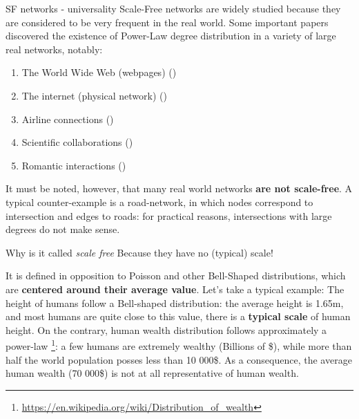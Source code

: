 \begin{textbox}{SF networks - universality}
    Scale-Free networks are widely studied because they are considered to be very frequent in the real world. Some important papers discovered the existence of Power-Law degree distribution in a variety of large real networks, notably:
    \begin{enumerate}
        \item The World Wide Web (webpages) (\cite{barabasi1999emergence})
        \item The internet (physical network) (\cite{faloutsos1999power})
        \item Airline connections (\cite{guimera2004modeling})
        \item Scientific collaborations (\cite{newman2001structure})
        \item Romantic interactions (\cite{liljeros2001web})
    \end{enumerate}

    It must be noted, however, that many real world networks \textbf{are not scale-free}. A typical counter-example is a road-network, in which nodes correspond to intersection and edges to roads: for practical reasons, intersections with large degrees do not make sense.
\end{textbox}

\begin{textbox}{Why is it called \textit{scale free}}
    Because they have no (typical) scale!

    It is defined in opposition to Poisson and other Bell-Shaped distributions, which are \textbf{centered around their average value}. Let's take a typical example: The height of humans follow a Bell-shaped distribution: the average height is 1.65m, and most humans are quite close to this value, there is a \textbf{typical scale} of human height. On the contrary, human wealth distribution follows approximately a power-law \footnote{ \url{https://en.wikipedia.org/wiki/Distribution_of_wealth}}: a few humans are extremely wealthy (Billions of \$), while more than half the world population posses less than 10 000\$. As a consequence, the average human wealth (70 000\$) is not at all representative of human wealth.
\end{textbox}


